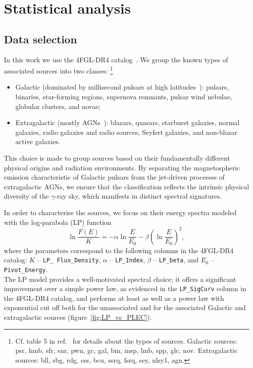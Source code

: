 \documentclass[12pt, a4paper]{article}
\newcommand{\be}{\begin{equation}}
\newcommand{\ee}{\end{equation}}
\begin{document}
\section{Statistical analysis}
\label{sec:approach}

\subsection{Data selection}
\label{sec:data}


In this work we use the 4FGL-DR4 catalog~\cite{2022ApJS..260...53A, 2023arXiv230712546B}. We group the known types of associated sources into two classes:%
\footnote{Cf. table 5 in ref.~\cite{2022ApJS..260...53A} for details about the types of sources. Galactic sources: psr, hmb, sfr, snr, pwn, gc, gal, bin, msp, lmb, spp, glc, nov. Extragalactic sources: bll, sbg, rdg, css, bcu, ssrq, fsrq, sey, nlsy1, agn.}
\begin{itemize}
    \item Galactic {(dominated by millisecond pulsars at high latitudes~\cite{smith2023third, 2020ApJS..247...33A, Fornasa:2015qua, Hooper:2024avz, Cholis:2014noa, Caraveo:2013lra})}: pulsars, binaries, star-forming regions, supernova remnants, pulsar wind nebulae, globular clusters, and novae;
    \item Extragalactic ({mostly AGNs~\cite{fossati1998unifying, 2020ApJS..247...33A, Fornasa:2015qua, Dermer:2009zz, Fermi-LAT:2014ryh, Ajello:2015mfa, Lisanti:2016jub}}): blazars, quasars, starburst galaxies, normal galaxies, radio galaxies and radio sources, Seyfert galaxies, and non-blazar active galaxies.
\end{itemize}
%
%
{This choice is made to group sources based on their fundamentally different physical origins and radiation environments. By separating the magnetospheric emission characteristic of Galactic pulsars from the jet-driven processes of extragalactic AGNs, we ensure that the classification reflects the intrinsic physical diversity of the $\gamma$-ray sky, which manifests in distinct spectral signatures.}

In order to characterise the sources, we focus on their energy spectra modeled with the log-parabola (LP) function
\be
\label{eq:log_par}
\ln \frac{F(E)}{K} = - \alpha \ln \frac{E}{E_0} - \beta \left(\ln \frac{E}{E_0} \right)^2,
\ee
where the parameters correspond to the following columns in the 4FGL-DR4 catalog:
$K$ -- {\tt LP\_ Flux\_Density},
$\alpha$ -- {\tt LP\_Index},
$\beta$ -- {\tt LP\_beta},
and $E_0$ -- {\tt Pivot\_Energy}.
%
\\
{The LP model provides a well-motivated spectral choice; it offers a significant improvement over a simple power law, as evidenced in the \texttt{LP\_SigCurv} column in the 4FGL-DR4 catalog, and performs at least as well as a power law with exponential cut off both for the unassociated and for the associated Galactic and extragalactic sources (figure~\ref{fig:LP_vs_PLEC}).} 
\end{document}
